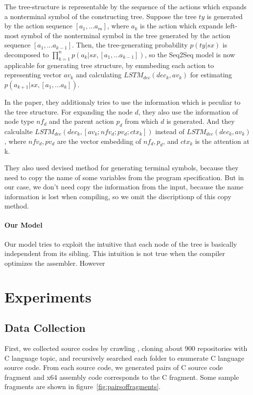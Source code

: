 \documentclass[senior,final,11pt]{iscs-thesis}
\begin{document}
The tree-structure is representable by the sequence of the actions which expands a nonterminal symbol of the constructing tree.
Suppose the tree $ty$ is generated by the action sequence $ [a_1, \dots a_m] $, 
where $ a_k $ is the action which expands left-most symbol of the nonterminal symbol in the tree generated by the action sequence $ [a_1, \dots a_{k-1}] $. 
Then, the tree-generating probability $ p(ty|sx) $ is decomposed to $ \prod_{k=1}^n p(a_k|sx,[a_1, \dots a_{k-1}]) $, 
so the Seq2Seq model is now applicable for generating tree structure, by emmbeding each action to representing vector $av_k$ and 
calculating $ LSTM_{dec}(dec_{k},av_{k}) $ for estimating $p(a_{k+1}|sx,[a_1, \dots a_{k}]) $.  

In the paper, they additionaly tries to use the information which is peculiar to the tree structure. 
For expanding the node $d$, they also use the information of node type $ nf_{d} $ and the parent action $p_{d}$ from which $d$ is generated.
And they calculalte $ LSTM_{dec}(dec_{k},[av_{k}; nfv_{d}; pv_{d}; ctx_{k}]) $ instead of $ LSTM_{dec}(dec_{k},av_{k}) $, 
where $nfv_{d},pv_{d}$ are the vector embedding of $nf_{d},p_{d}$, and $ctx_{k}$ is the attention at k.

They also used devised method for generating terminal symbols, because they need to copy the name of some variables from the program specification.
But in our case, we don't need copy the information from the input, because the name information is lost when compiling, so we omit the discriptionp of this copy method.


\subsubsection{Our Model}
Our model tries to exploit the intuitive that each node of the tree is basically independent from its sibling.
This intuition is not true when the compiler optimizes the assembler. 
However  









\chapter{Experiments}

\section{Data Collection}
First, we collected source codes by crawling \cite[GitHub]{github}, cloning about 900 repositories with C language topic, 
and recursively searched each folder to enumerate C language source code.
From each source code, we generated pairs of C source code fragment and x64 assembly code corresponds to the C fragment.
Some sample fragments are shown in figure~\ref{fig:pairsoffragments}. 
\end{document}
